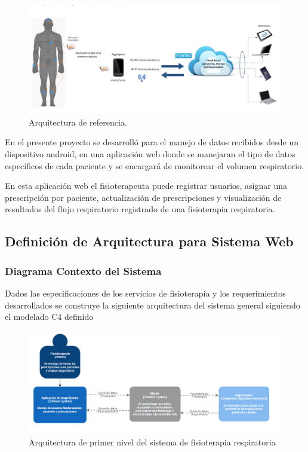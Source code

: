 \documentclass[12pt]{article}
\begin{document}
\begin{figure}[ht]
\centering
\includegraphics[scale=0.4]{imag/ArquitecturaREF.png}
\caption{Arquitectura de referencia. } %
\label{3}
\end{figure}
\FloatBarrier

En el presente proyecto se desarrolló para el manejo de datos recibidos desde un dispositivo android, en una aplicación web donde se manejaran el tipo de datos específicos de cada paciente y se encargará de monitorear el volumen respiratorio.

En esta aplicación web el fisioterapeuta puede registrar usuarios, asignar una prescripción por paciente, actualización de prescripciones y visualización de resultados del flujo respiratorio registrado de una fisioterapia respiratoria.




\subsection{Definición de Arquitectura para Sistema Web}


\subsubsection{Diagrama Contexto del Sistema}

Dados las especificaciones de los servicios de fisioterapia y los requerimientos desarrollados se construye la siguiente arquitectura del sistema general siguiendo el modelado C4 definido

\begin{figure}[ht]
\centering
\includegraphics[scale=0.7]{imag/L1C4.PNG}
\caption{Arquitectura de primer nivel del sistema de fisioterapia respiratoria}
\label{5}
\end{figure}
\FloatBarrier
\end{document}
